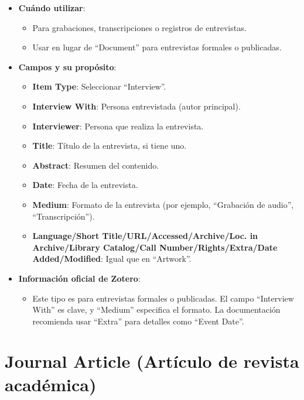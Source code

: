 \documentclass[
  jou,
  floatsintext,
  longtable,
  a4paper,
  nolmodern,
  notxfonts,
  notimes,
  12pt,
  colorlinks=true,linkcolor=blue,citecolor=blue,urlcolor=blue]{apa7}
\providecommand{\tightlist}{%
  \setlength{\itemsep}{0pt}\setlength{\parskip}{0pt}}
\begin{document}
\begin{itemize}
\tightlist
\item
  \textbf{Cuándo utilizar}:

  \begin{itemize}
  \tightlist
  \item
    Para grabaciones, transcripciones o registros de entrevistas.
  \item
    Usar en lugar de ``Document'' para entrevistas formales o
    publicadas.
  \end{itemize}
\item
  \textbf{Campos y su propósito}:

  \begin{itemize}
  \tightlist
  \item
    \textbf{Item Type}: Seleccionar ``Interview''.
  \item
    \textbf{Interview With}: Persona entrevistada (autor principal).
  \item
    \textbf{Interviewer}: Persona que realiza la entrevista.
  \item
    \textbf{Title}: Título de la entrevista, si tiene uno.
  \item
    \textbf{Abstract}: Resumen del contenido.
  \item
    \textbf{Date}: Fecha de la entrevista.
  \item
    \textbf{Medium}: Formato de la entrevista (por ejemplo, ``Grabación
    de audio'', ``Transcripción'').
  \item
    \textbf{Language/Short Title/URL/Accessed/Archive/Loc. in
    Archive/Library Catalog/Call Number/Rights/Extra/Date
    Added/Modified}: Igual que en ``Artwork''.
  \end{itemize}
\item
  \textbf{Información oficial de Zotero}:

  \begin{itemize}
  \tightlist
  \item
    Este tipo es para entrevistas formales o publicadas. El campo
    ``Interview With'' es clave, y ``Medium'' especifica el formato. La
    documentación recomienda usar ``Extra'' para detalles como ``Event
    Date''.
  \end{itemize}
\end{itemize}

\section{Journal Article (Artículo de revista
académica)}\label{journal-article-artuxedculo-de-revista-acaduxe9mica}
\end{document}
